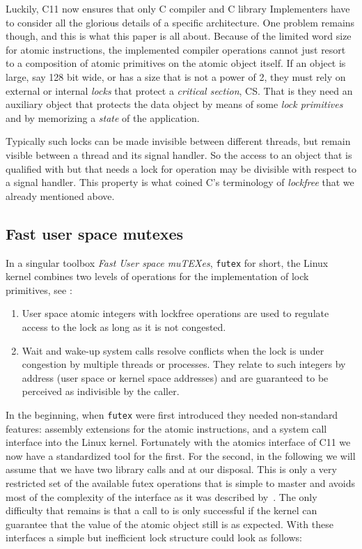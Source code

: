 Luckily, C11 now ensures that only C compiler and C library
Implementers have to consider all the glorious details of a
specific architecture. One problem remains though, and this is what
this paper is all about. Because of the limited word size for
atomic instructions, the implemented compiler operations cannot just
resort to a composition of atomic primitives on the atomic object
itself. If an object is large, say 128 bit wide, or has a size that
is not a power of 2, they must rely on external or internal \emph{locks}
that protect a \emph{critical section}, CS. That is they need an
auxiliary object that protects the data object by means of some
\emph{lock primitives} and by memorizing a \emph{state} of the application.

Typically such locks can be made invisible between different
threads, but remain visible between a thread and its signal
handler. So the access to an object that is qualified with
 but that needs a lock for operation may be divisible with
respect to a signal handler. This property is what coined C's
terminology of \emph{lockfree} that we already mentioned above.
\fi

\subsection{Fast user space mutexes}
\label{sec-2-3}

In a singular toolbox \emph{Fast User space muTEXes}, \texttt{futex} for
short, the Linux kernel combines two levels of operations for the
implementation of lock primitives, see
\cite{Hutton02fuss,hart09}:
\iflong
\begin{enumerate}
\item User space atomic integers with lockfree operations are used to
regulate access to the lock as long as it is not congested.\itemadjust

\item Wait and wake-up system calls resolve conflicts when the lock is
under congestion by multiple threads or processes. They relate
to such integers by address (user space or kernel space
addresses) and are guaranteed to be perceived as indivisible by
the caller.\itemadjust
\end{enumerate}

In the beginning, when \texttt{futex} were first introduced they needed
non-standard features: assembly extensions for the atomic
instructions, and a system call interface into the Linux
kernel. Fortunately with the atomics interface of C11 we now have
a standardized tool for the first. For the second, in the
following we will assume that we have two library calls
 and  at our disposal.
%
This is only a very restricted set of the available futex operations that
is simple to master and avoids most of the complexity of the interface as
it was described by~\cite{drepper11:futex}. The only difficulty that
remains is that a call to  is only successful if the
kernel can guarantee that the value of the atomic object still is as
expected.
%
\fi
With these interfaces a simple but
inefficient lock structure  could look as follows:


